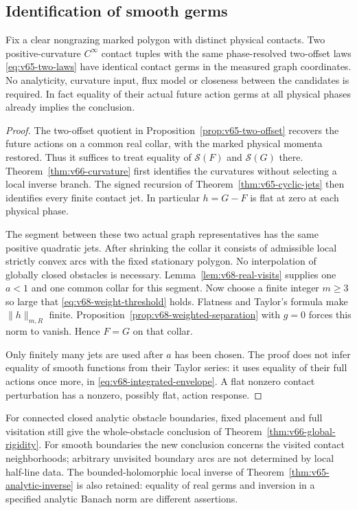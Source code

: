 \subsection{Identification of smooth germs}

\begin{theorem}
\label{thm:v68-smooth-rigidity}
Fix a clear nongrazing marked polygon with distinct physical contacts.
Two positive-curvature $C^\infty$ contact tuples with the same
phase-resolved two-offset laws \eqref{eq:v65-two-laws} have identical
contact germs in the measured graph coordinates.  No analyticity,
curvature input, flux model or closeness between the candidates is
required.  In fact equality of their actual future action germs at all
physical phases already implies the conclusion.
\end{theorem}
\begin{proof}
The two-offset quotient in Proposition~\ref{prop:v65-two-offset}
recovers the future actions on a common real collar, with the marked
physical momenta restored.  Thus it suffices to treat equality of
$\mathcal S(F)$ and $\mathcal S(G)$ there.
Theorem~\ref{thm:v66-curvature} first identifies the curvatures
without selecting a local inverse branch.  The signed recursion of
Theorem~\ref{thm:v65-cyclic-jets} then identifies every finite contact
jet.  In particular $h=G-F$ is flat at zero at each physical phase.

The segment between these two actual graph representatives has the
same positive quadratic jets.  After shrinking the collar it consists
of admissible local strictly convex arcs with the fixed stationary
polygon.  No interpolation of globally closed obstacles is necessary.
Lemma~\ref{lem:v68-real-visits} supplies one $a<1$ and one common
collar for this segment.  Now choose a finite integer $m\ge3$ so large
that \eqref{eq:v68-weight-threshold} holds.  Flatness and Taylor's
formula make $\|h\|_{m,R}$ finite.  Proposition~\ref{prop:v68-weighted-separation}
with $g=0$ forces this norm to vanish.  Hence $F=G$ on that collar.

Only finitely many jets are used after $a$ has been chosen.  The proof
does not infer equality of smooth functions from their Taylor series:
it uses equality of their full actions once more, in
\eqref{eq:v68-integrated-envelope}.  A flat nonzero contact perturbation
has a nonzero, possibly flat, action response.
\end{proof}

For connected closed analytic obstacle boundaries, fixed placement and
full visitation still give the whole-obstacle conclusion of
Theorem~\ref{thm:v66-global-rigidity}.  For smooth boundaries the
new conclusion concerns the visited contact neighborhoods; arbitrary
unvisited boundary arcs are not determined by local half-line data.
The bounded-holomorphic local inverse of
Theorem~\ref{thm:v65-analytic-inverse} is also retained: equality of
real germs and inversion in a specified analytic Banach norm are
different assertions.

